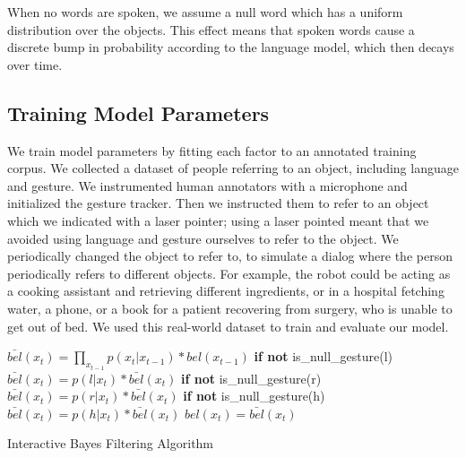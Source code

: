 \documentclass[letterpaper, 10 pt, conference]{ieeeconf}
\begin{document}
When no words are spoken, we assume a null word which has a uniform
distribution over the objects.  This effect means that spoken words
cause a discrete bump in probability according to the language model,
which then decays over time.  

\subsection{Training Model Parameters}

We train model parameters by fitting each factor to an annotated
training corpus.  We collected a dataset of people referring to an
object, including language and gesture.  We instrumented human
annotators with a microphone and initialized the gesture tracker.
Then we instructed them to refer to an object which we indicated with
a laser pointer; using a laser pointed meant that we avoided using
language and gesture ourselves to refer to the object.  We periodically
changed the object to refer to, to simulate a dialog where the person
periodically refers to different objects.  For example, the robot
could be acting as a cooking assistant and retrieving different
ingredients, or in a hospital fetching water, a phone, or a book for a
patient recovering from surgery, who is unable to get out of bed.  We
used this real-world dataset to train and evaluate our model.

\begin{algorithm}
    \DontPrintSemicolon
    \BlankLine
    \BlankLine
     {
      $\bar{bel}(x_t) = \displaystyle\prod_{x_{t-1}} p(x_t|x_{t-1})*bel(x_{t-1})$
      \BlankLine
      \textbf{if not} is\_null\_gesture(l)
      \BlankLine
      \Indp$\bar{bel}(x_t) = p(l | x_t) *  \bar{bel}(x_t)$
      \BlankLine
      \Indm\textbf{if not} is\_null\_gesture(r)
      \BlankLine
      \Indp$\bar{bel}(x_t) = p(r | x_t) *  \bar{bel}(x_t)$
      \BlankLine
      \Indm\textbf{if not} is\_null\_gesture(h)
      \BlankLine
      \Indp$\bar{bel}(x_t) = p(h | x_t) *  \bar{bel}(x_t)$
      \BlankLine
      \Indm{}
      $bel(x_t) = \bar{bel}(x_t)$

    }
    \BlankLine
\caption{Interactive Bayes Filtering Algorithm} 
\label{alg:algorithm}
\end{algorithm}
\end{document}
